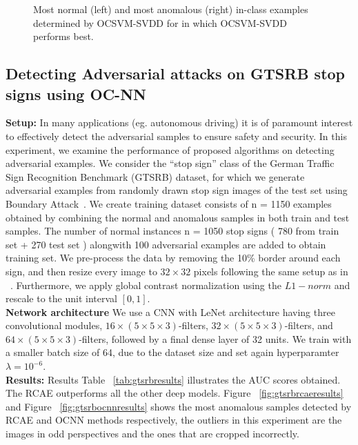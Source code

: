 \begin{figure}[htp]
          \centering
          \hspace{1em}%
       \caption{Most normal (left) and most anomalous (right) in-class
       examples determined by OCSVM-SVDD for in which OCSVM-SVDD performs best.}
        \label{fig:ocsvmresults}
 \end{figure}


\subsection{ Detecting Adversarial attacks on GTSRB stop signs using OC-NN }
\textbf{Setup:}
In many applications (eg. autonomous driving) it is of paramount interest to effectively detect the adversarial samples to ensure safety and security. In this experiment, we
examine  the performance of proposed algorithms on  detecting
adversarial examples. We consider the “stop sign”
class of the German Traffic Sign Recognition Benchmark
(GTSRB) dataset, for which we generate adversarial examples
from randomly drawn stop sign images of the test set
using Boundary Attack~\cite{brendel2017decision}. We create training dataset consists of n = 1150 examples obtained by combining the normal and anomalous samples in both train and test samples. The  number of normal instances n = 1050 stop signs ( 780  from train set +  270 test set ) alongwith  100
adversarial examples are added to obtain training set. We pre-process the
data by removing the 10\% border around each sign, and then resize every image to $32 \times 32$ pixels following the same setup as in ~\cite{pmlrv80ruff18a}. Furthermore, we  apply global contrast normalization using the $L1-norm$ and rescale to the unit interval $[0, 1]$.\\
\textbf{Network architecture} We use a CNN with LeNet architecture having three convolutional modules, $16\times(5\times5\times3)$-filters, $32 \times (5 \times 5 \times 3)$-filters, and $64 \times (5 \times 5 \times 3)$-filters, followed by a final dense layer of 32 units. We train with a smaller batch size of 64, due to the dataset size and set again hyperparamter $\lambda = 10^{ - 6}$.\\
\textbf{Results:}
Results Table ~\ref{tab:gtsrbresults} illustrates the AUC scores obtained. The RCAE outperforms all the other deep models. Figure ~\ref{fig:gtsrbrcaeresults} and Figure ~\ref{fig:gtsrbocnnresults}  shows the most anomalous samples detected by RCAE and OCNN methods respectively, the outliers in this experiment are the images in odd perspectives and the ones that are cropped incorrectly.

